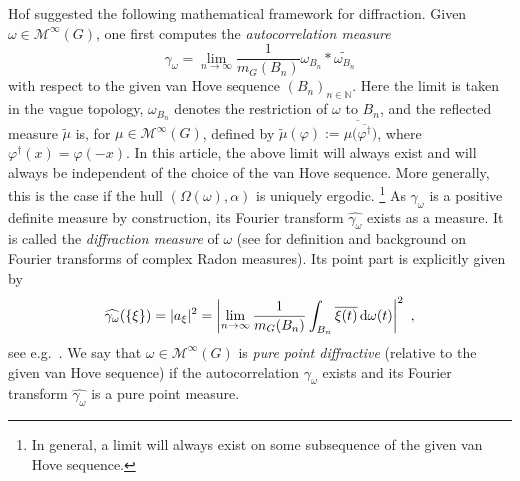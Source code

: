 \documentclass[11pt, a4wide]{amsart}
\numberwithin{lemma}{section}
\begin{document}
\smallskip

Hof \cite{Hof} suggested the following mathematical framework for diffraction. Given $\omega\in \mathcal M^\infty(G)$, one first computes the \textit{autocorrelation measure}
%
\begin{displaymath}
\gamma_\omega = \lim_{n\to \infty} \frac{1}{m_G(B_n)} \omega_{B_n} \ast
\widetilde{\omega_{B_n}} 
\end{displaymath}
%
with respect to the given van Hove sequence $(B_n)_{n\in \mathbb N}$.
Here the limit is taken in the vague topology,  $\omega_{B_n}$ denotes the
 restriction of $\omega$ to $B_n$, and the reflected measure
$\widetilde{\mu}$ is, for $\mu\in \mathcal M^\infty(G)$,  defined by $\widetilde{\mu}(\varphi):=\overline{ \mu(
  \overline{ \varphi^\dag} })$, where $\varphi^\dag(x)=\varphi(-x)$.  In this article, the above limit will always exist and will always be  independent of the choice of the van Hove sequence. More generally, this is the case if the hull $(\Omega(\omega), \alpha)$ is uniquely ergodic.%
%
\footnote{In general, a limit will always exist on some subsequence of the given van Hove sequence.}
%
As $\gamma_\omega$ is a positive definite measure by construction, its  Fourier transform $\widehat{\gamma_\omega}$ exists as a measure. It is called the
\textit{diffraction measure} of $\omega$  (see \cite{Fol,BF,ARMA1,GdeL,MoSt} for definition and background on Fourier transforms of complex Radon measures). Its point part is  explicitly given by
\begin{equation}\label{eq:FBC2}
\widehat{\gamma_\omega} (\{\xi\}) = |a_\xi|^2=\left|\lim_{n\to \infty} \frac{1}{m_G(B_n)} \int_{B_n} \overline{\xi (t)} \, {\rm d}\omega(t) \right|^2 \ ,
\end{equation}
%
see e.g.~\cite[Thm.~3.4]{Hof}.
We say that $\omega\in \mathcal M^\infty(G)$ is \textit{pure point diffractive} (relative to the given van Hove sequence) if the autocorrelation $\gamma_\omega$ exists and its Fourier transform $\widehat{\gamma_\omega}$ is a pure point measure. 

\medskip
\end{document}
